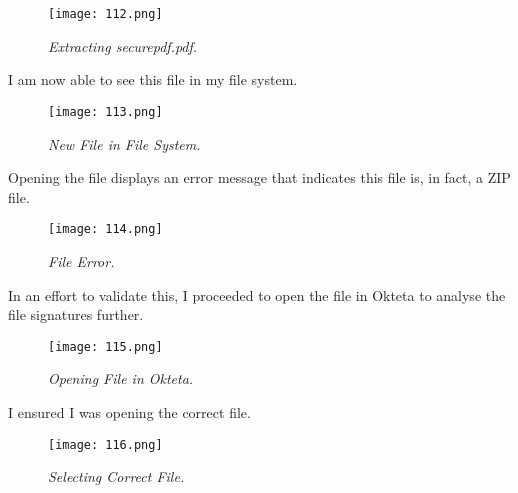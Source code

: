 \begin{figure}[H]
    \setlength{\abovecaptionskip}{20pt}
    \setlength{\belowcaptionskip}{0pt}
    \centering
    \texttt{[image: 112.png]}
    \captionsetup{justification=centering}
    \caption{\textit{Extracting securepdf.pdf.}}
    \label{fig:112}
\end{figure}
\vspace{-10pt}

I am now able to see this file in my file system.

\begin{figure}[H]
    \setlength{\abovecaptionskip}{20pt}
    \setlength{\belowcaptionskip}{0pt}
    \centering
    \texttt{[image: 113.png]}
    \captionsetup{justification=centering}
    \caption{\textit{New File in File System.}}
    \label{fig:113}
\end{figure}
\vspace{-10pt}

Opening the file displays an error message that indicates this file is, in fact, a ZIP file. 

\begin{figure}[H]
    \setlength{\abovecaptionskip}{20pt}
    \setlength{\belowcaptionskip}{0pt}
    \centering
    \texttt{[image: 114.png]}
    \captionsetup{justification=centering}
    \caption{\textit{File Error.}}
    \label{fig:114}
\end{figure}
\vspace{-10pt}

In an effort to validate this, I proceeded to open the file in Okteta to analyse the file signatures further.

\begin{figure}[H]
    \setlength{\abovecaptionskip}{20pt}
    \setlength{\belowcaptionskip}{0pt}
    \centering
    \texttt{[image: 115.png]}
    \captionsetup{justification=centering}
    \caption{\textit{Opening File in Okteta.}}
    \label{fig:115}
\end{figure}
\vspace{-10pt}

I ensured I was opening the correct file.

\begin{figure}[H]
    \setlength{\abovecaptionskip}{20pt}
    \setlength{\belowcaptionskip}{0pt}
    \centering
    \texttt{[image: 116.png]}
    \captionsetup{justification=centering}
    \caption{\textit{Selecting Correct File.}}
    \label{fig:116}
\end{figure}
\vspace{-10pt}

